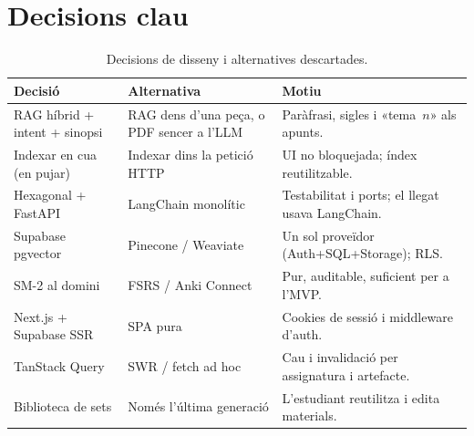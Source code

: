 \section{Decisions clau}

\begin{table}[htbp]
\centering
\caption{Decisions de disseny i alternatives descartades.}
\label{tab:decisiones}
\small
\begin{tabularx}{\textwidth}{lXl}
\toprule
Decisió & Alternativa & Motiu \\
\midrule
RAG híbrid + intent + sinopsi & RAG dens d'una peça, o PDF sencer a l'LLM & Paràfrasi, sigles i «tema~$n$» als apunts. \\
Indexar en cua (en pujar) & Indexar dins la petició HTTP & UI no bloquejada; índex reutilitzable. \\
Hexagonal + FastAPI & LangChain monolític & Testabilitat i ports; el llegat usava LangChain. \\
Supabase pgvector & Pinecone / Weaviate & Un sol proveïdor (Auth+SQL+Storage); RLS. \\
SM-2 al domini & FSRS / Anki Connect & Pur, auditable, suficient per a l'MVP. \\
Next.js + Supabase SSR & SPA pura & Cookies de sessió i middleware d'auth. \\
TanStack Query & SWR / fetch ad hoc & Cau i invalidació per assignatura i artefacte. \\
Biblioteca de sets & Només l'última generació & L'estudiant reutilitza i edita materials. \\
\bottomrule
\end{tabularx}
\end{table}

